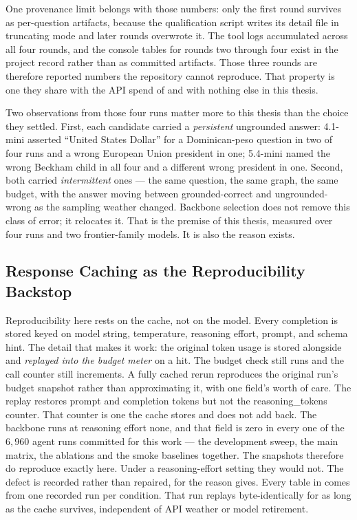 One provenance limit belongs with those numbers: only the first round survives
as per-question artifacts, because the qualification script writes its detail
file in truncating mode and later rounds overwrote it. The tool logs accumulated
across all four rounds, and the console tables for rounds two through four exist
in the project record rather than as committed artifacts. Those three rounds are
therefore reported numbers the repository cannot reproduce. That property is one
they share with the API spend of  and with nothing else in
this thesis.

Two observations from those four runs matter more to this thesis than the choice
they settled. First, each candidate carried a \emph{persistent} ungrounded
answer: 4.1-mini asserted ``United States Dollar'' for a Dominican-peso question
in two of four runs and a wrong European Union president in one; 5.4-mini named
the wrong Beckham child in all four and a different wrong president in one.
Second, both carried \emph{intermittent} ones --- the same question, the same
graph, the same budget, with the answer moving between grounded-correct and
ungrounded-wrong as the sampling weather changed. Backbone selection does not
remove this class of error; it relocates it. That is the premise of this thesis,
measured over four runs and two frontier-family models. It is also the reason
 exists.

\subsection{Response Caching as the Reproducibility Backstop}

Reproducibility here rests on the cache, not on the model. Every completion is
stored keyed on model string, temperature, reasoning effort, prompt, and schema
hint. The detail that makes it work: the original token usage is stored
alongside and \emph{replayed into the budget meter} on a hit. The budget check
still runs and the call counter still increments. A fully cached rerun
reproduces the original run's budget snapshot rather than approximating it, with
one field's worth of care. The replay restores prompt and completion tokens but
not the \textsf{reasoning\_tokens} counter. That counter is one the cache stores
and does not add back. The backbone runs at reasoning effort \textsf{none}, and
that field is zero in every one of the $6{,}960$ agent runs committed for this
work --- the development sweep, the main matrix, the ablations and the smoke
baselines together. The snapshots therefore do reproduce exactly here. Under a
reasoning-effort setting they would not. The defect is recorded rather than
repaired, for the reason  gives. Every table in
 comes from one recorded run per condition. That run replays
byte-identically for as long as the cache survives, independent of API weather
or model retirement.

